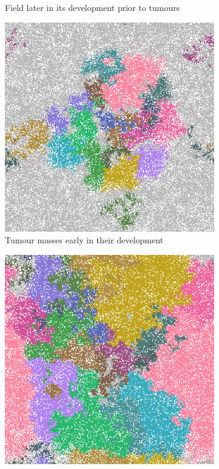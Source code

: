 \documentclass[\main/thesis.tex]{subfiles}
\begin{document}
\begin{figure}[H]
\begin{subfigure}[t]{.45\textwidth}
      \caption{Field later in its development prior to tumours}
      \label{fig:GeneralObservations_lateFieldLineages}
    \end{subfigure}
    \begin{subfigure}[t]{.45\textwidth}
      \centering
      \includegraphics[width=\textwidth]{images/2_GeneralObservations/Fig6/4_early_tumour_1975.jpeg}
      \caption{Tumour masses early in their development}
      \label{fig:GeneralObservations_earlyTumourLineages}
    \end{subfigure}
    \begin{subfigure}[t]{.45\textwidth}
      \centering
      \includegraphics[width=\textwidth]{images/2_GeneralObservations/Fig6/5_late_tumour_3947.jpeg}

\end{subfigure}
\end{figure}
\end{document}
